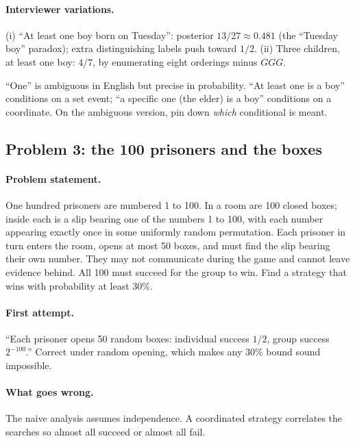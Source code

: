 \paragraph{Interviewer variations.}
(i) ``At least one boy born on Tuesday'': posterior $13/27
\approx 0.481$ (the ``Tuesday boy'' paradox); extra distinguishing
labels push toward $1/2$.  (ii) Three children, at least one boy:
$4/7$, by enumerating eight orderings minus $GGG$.

\begin{pitfallbox}
``One'' is ambiguous in English but precise in probability.  ``At
least one is a boy'' conditions on a set event; ``a specific one
(the elder) is a boy'' conditions on a coordinate.  On the
ambiguous version, pin down \emph{which} conditional is meant.
\end{pitfallbox}

\subsection{Problem 3: the 100 prisoners and the boxes}
\label{sec:prisoners}

\paragraph{Problem statement.}
One hundred prisoners are numbered 1 to 100.  In a room are 100
closed boxes; inside each is a slip bearing one of the
numbers 1 to 100, with each number appearing exactly once in some
uniformly random permutation.  Each prisoner in turn enters the
room, opens at most 50 boxes, and must find the slip bearing
their own number.  They may not communicate during the game and
cannot leave evidence behind.  All 100 must succeed for the group
to win.  Find a strategy that wins with probability at least $30\%$.

\paragraph{First attempt.}
``Each prisoner opens 50 random boxes: individual success $1/2$,
group success $2^{-100}$.''  Correct under random opening, which
makes any $30\%$ bound sound impossible.

\paragraph{What goes wrong.}
The naive analysis assumes independence.  A coordinated strategy
correlates the searches so almost all succeed or almost all fail.

